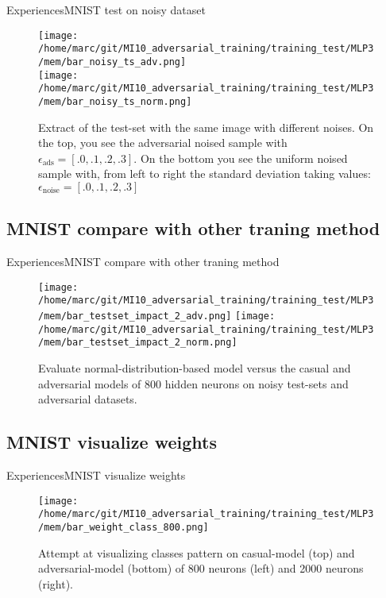 \documentclass[10pt]{beamer}
\begin{document}
\begin{frame}{Experiences}{MNIST test on noisy dataset}
  \pause
  \begin{figure}
    \centering
    \texttt{[image: /home/marc/git/MI10\_adversarial\_training/training\_test/MLP3/mem/bar\_noisy\_ts\_adv.png]}\\
    \texttt{[image: /home/marc/git/MI10\_adversarial\_training/training\_test/MLP3/mem/bar\_noisy\_ts\_norm.png]}
    \caption{Extract of the test-set with the same image with different noises. On the top, you see the adversarial noised sample with $\epsilon_{\text{ads}} = [.0, .1, .2, .3]$. On the bottom you see the uniform noised sample with, from left to right the standard deviation taking values: $\epsilon_{\text{noise}} = [.0, .1, .2, .3]$}
    \label{fig:mnist_adv_noisy_ds_img}
  \end{figure}
\end{frame}

\subsection{MNIST compare with other traning method}
\begin{frame}{Experiences}{MNIST compare with other traning method}
  \pause
  \begin{figure}
    \centering
    \texttt{[image: /home/marc/git/MI10\_adversarial\_training/training\_test/MLP3/mem/bar\_testset\_impact\_2\_adv.png]}
    \texttt{[image: /home/marc/git/MI10\_adversarial\_training/training\_test/MLP3/mem/bar\_testset\_impact\_2\_norm.png]}
    \caption{Evaluate normal-distribution-based model versus the casual and adversarial models of 800 hidden neurons on noisy test-sets and adversarial datasets.}
    \label{fig:mnist_noisy_learn}
  \end{figure}
\end{frame}

\subsection{MNIST visualize weights}
\begin{frame}{Experiences}{MNIST visualize weights}
  \pause
  \begin{figure}
    \centering
    \texttt{[image: /home/marc/git/MI10\_adversarial\_training/training\_test/MLP3/mem/bar\_weight\_class\_800.png]}
    \caption{Attempt at visualizing classes pattern on casual-model (top) and adversarial-model (bottom) of 800 neurons (left) and 2000 neurons (right).}
    \label{fig:mnist_weight_class}
  \end{figure}
\end{frame}
\end{document}
